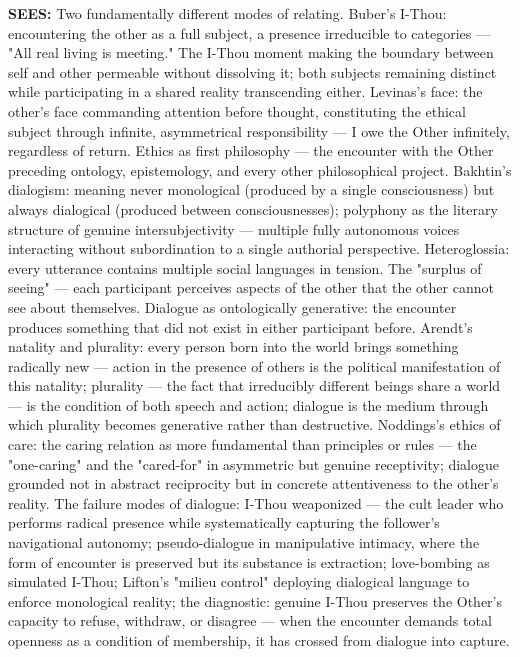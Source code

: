 \textbf{SEES:} Two fundamentally different modes of relating. Buber's I-Thou: encountering the other as a full subject, a presence irreducible to categories — "All real living is meeting." The I-Thou moment making the boundary between self and other permeable without dissolving it; both subjects remaining distinct while participating in a shared reality transcending either. Levinas's face: the other's face commanding attention before thought, constituting the ethical subject through infinite, asymmetrical responsibility — I owe the Other infinitely, regardless of return. Ethics as first philosophy — the encounter with the Other preceding ontology, epistemology, and every other philosophical project. Bakhtin's dialogism: meaning never monological (produced by a single consciousness) but always dialogical (produced between consciousnesses); polyphony as the literary structure of genuine intersubjectivity — multiple fully autonomous voices interacting without subordination to a single authorial perspective. Heteroglossia: every utterance contains multiple social languages in tension. The "surplus of seeing" — each participant perceives aspects of the other that the other cannot see about themselves. Dialogue as ontologically generative: the encounter produces something that did not exist in either participant before. Arendt's natality and plurality: every person born into the world brings something radically new — action in the presence of others is the political manifestation of this natality; plurality — the fact that irreducibly different beings share a world — is the condition of both speech and action; dialogue is the medium through which plurality becomes generative rather than destructive. Noddings's ethics of care: the caring relation as more fundamental than principles or rules — the "one-caring" and the "cared-for" in asymmetric but genuine receptivity; dialogue grounded not in abstract reciprocity but in concrete attentiveness to the other's reality. The failure modes of dialogue: I-Thou weaponized — the cult leader who performs radical presence while systematically capturing the follower's navigational autonomy; pseudo-dialogue in manipulative intimacy, where the form of encounter is preserved but its substance is extraction; love-bombing as simulated I-Thou; Lifton's "milieu control" deploying dialogical language to enforce monological reality; the diagnostic: genuine I-Thou preserves the Other's capacity to refuse, withdraw, or disagree — when the encounter demands total openness as a condition of membership, it has crossed from dialogue into capture.


